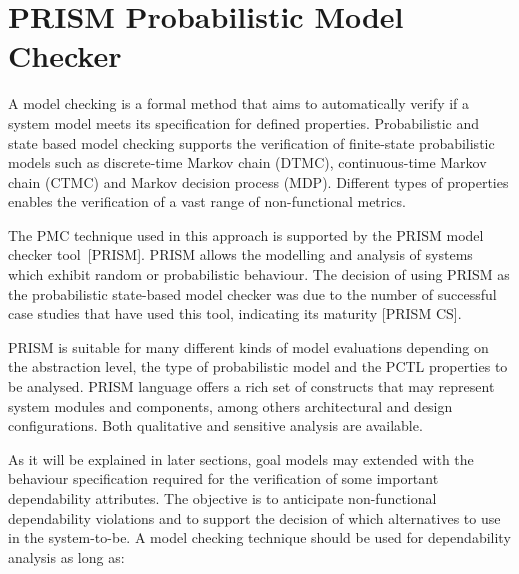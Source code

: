 %
%
%

\section{PRISM Probabilistic Model Checker}

A model checking is a formal method that aims to automatically verify if a system model meets its specification for defined properties. Probabilistic and state based model checking supports the verification of finite-state probabilistic models such as discrete-time Markov chain (DTMC), continuous-time Markov chain (CTMC) and Markov decision process (MDP). Different types of properties enables the verification of a vast range of non-functional metrics.

The PMC technique used in this approach is supported by the PRISM model checker tool~[PRISM]. PRISM allows the modelling and analysis of systems which exhibit random or probabilistic behaviour. The decision of using PRISM as the probabilistic state-based model checker was due to the number of successful case studies that have used this tool, indicating its maturity [PRISM CS].


PRISM is suitable for many different kinds of model evaluations depending on the abstraction level, the type of probabilistic model and the PCTL properties to be analysed. PRISM language offers a rich set of constructs that may represent system modules and components, among others architectural and design configurations. Both qualitative and sensitive analysis are available.

As it will be explained in later sections, goal models may extended with the behaviour specification required for the verification of some important dependability attributes. The objective is to anticipate non-functional dependability violations and to support the decision of which alternatives to use in the system-to-be. A model checking technique should be used for dependability analysis as long as: 

